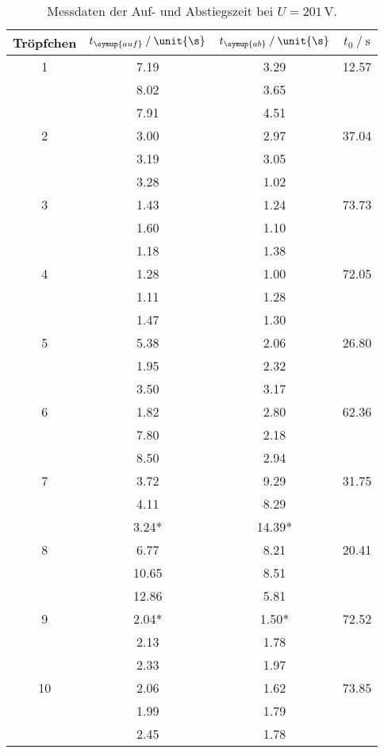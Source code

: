 \begin{table}
    \centering
    \caption{Messdaten der Auf- und Abstiegszeit bei $U=201\,\unit{\V}$.}
\begin{tabular}{c c c c}
    \toprule
        Tröpfchen &$t_{\symup{auf}} \mathbin{/} \unit{\s}$ & $t_{\symup{ab}}\mathbin{/} \unit{\s}$ & $t_0 \mathbin{/}\unit{\s}$ \\
    \midrule
    1&7.19&3.29&12.57\\
    &8.02&3.65&\\
    &7.91&4.51&\\
    2&3.00&2.97&37.04\\
    &3.19&3.05&\\
    &3.28&1.02&\\
    3&1.43&1.24&73.73\\
    &1.60&1.10&\\
    &1.18&1.38&\\
    4&1.28&1.00&72.05\\
    &1.11&1.28&\\
    &1.47&1.30&\\
    5&5.38&2.06&26.80\\
    &1.95&2.32&\\
    &3.50&3.17&\\
    6&1.82&2.80&62.36\\
    &7.80&2.18&\\
    &8.50&2.94&\\
    7&3.72&9.29&31.75\\
    &4.11&8.29&\\
    &3.24*&14.39*&\\
    8&6.77&8.21&20.41 \\
    &10.65&8.51&\\
    &12.86&5.81&\\
    9&2.04*&1.50*&72.52\\
    &2.13&1.78&\\
    &2.33&1.97&\\
    10&2.06&1.62&73.85 \\
    &1.99&1.79&\\
    &2.45&1.78& \\
    \bottomrule
    \end{tabular}
    \label{tab:200}
\end{table}

